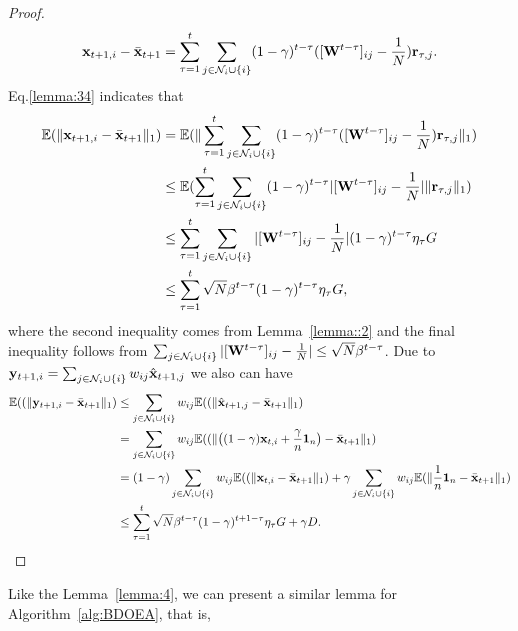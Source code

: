\begin{proof}
\begin{equation}
			\mathbf{x}_{t+1,i}-\bar{\mathbf{x}}_{t+1}=\sum_{\tau=1}^{t}\sum_{j\in\mathcal{N}_{i}\cup\{i\}}(1-\gamma)^{t-\tau}([\mathbf{W}^{t-\tau}]_{ij}-\frac{1}{N})\mathbf{r}_{\tau,j}.
		\end{equation}
		Eq.\eqref{lemma:34} indicates that
		\begin{equation*}
			\begin{aligned}
				\mathbb{E}(\|\mathbf{x}_{t+1,i}-\bar{\mathbf{x}}_{t+1}\|_{1})&=\mathbb{E}(\|\sum_{\tau=1}^{t}\sum_{j\in\mathcal{N}_{i}\cup\{i\}}(1-\gamma)^{t-\tau}([\mathbf{W}^{t-\tau}]_{ij}-\frac{1}{N})\mathbf{r}_{\tau,j}\|_{1})\\
				&\le\mathbb{E}(\sum_{\tau=1}^{t}\sum_{j\in\mathcal{N}_{i}\cup\{i\}}(1-\gamma)^{t-\tau}|[\mathbf{W}^{t-\tau}]_{ij}-\frac{1}{N}|\|	\mathbf{r}_{\tau,j}\|_{1})\\
				&\le\sum_{\tau=1}^{t}\sum_{j\in\mathcal{N}_{i}\cup\{i\}}|[\mathbf{W}^{t-\tau}]_{ij}-\frac{1}{N}|(1-\gamma)^{t-\tau}\eta_{\tau}G\\
				&\le\sum_{\tau=1}^{t}\sqrt{N}\beta^{t-\tau}(1-\gamma)^{t-\tau}\eta_{\tau}G,
			\end{aligned}
		\end{equation*} where the second inequality comes from Lemma~\ref{lemma::2} and the final inequality follows from $\sum_{j\in\mathcal{N}_{i}\cup\{i\}}|[\mathbf{W}^{t-\tau}]_{ij}-\frac{1}{N}|\le\sqrt{N}\beta^{t-\tau}$.
		Due to $\mathbf{y}_{t+1,i}=\sum_{j\in\mathcal{N}_{i}\cup\{i\}}w_{ij}\hat{\mathbf{x}}_{t+1,j}$ we also can have 
		\begin{equation*}
			\begin{aligned}
				\mathbb{E}((\|\mathbf{y}_{t+1,i}-\bar{\mathbf{x}}_{t+1}\|_{1})&\le\sum_{j\in\mathcal{N}_{i}\cup\{i\}}w_{ij}\mathbb{E}((\|\hat{\mathbf{x}}_{t+1,j}-\bar{\mathbf{x}}_{t+1}\|_{1})\\
				&=\sum_{j\in\mathcal{N}_{i}\cup\{i\}}w_{ij}\mathbb{E}((\|\big((1-\gamma)\mathbf{x}_{t,i}+\frac{\gamma}{n}\mathbf{1}_{n}\big)-\bar{\mathbf{x}}_{t+1}\|_{1})\\
				&=(1-\gamma)\sum_{j\in\mathcal{N}_{i}\cup\{i\}}w_{ij}\mathbb{E}((\|\mathbf{x}_{t,i}-\bar{\mathbf{x}}_{t+1}\|_{1})+\gamma\sum_{j\in\mathcal{N}_{i}\cup\{i\}}w_{ij}\mathbb{E}(\|\frac{1}{n}\mathbf{1}_{n}-\bar{\mathbf{x}}_{t+1}\|_{1})\\
				&\le\sum_{\tau=1}^{t}\sqrt{N}\beta^{t-\tau}(1-\gamma)^{t+1-\tau}\eta_{\tau}G+\gamma D.
			\end{aligned}
		\end{equation*}
	\end{proof}
	Like the Lemma~\ref{lemma:4}, we can present a similar lemma for Algorithm~\ref{alg:BDOEA},  that is,
